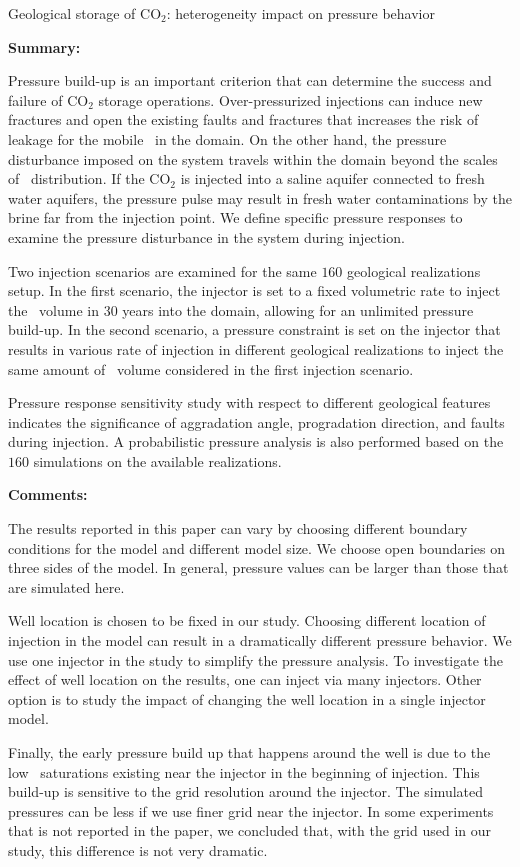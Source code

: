 {Geological storage of CO$_2$: heterogeneity impact on pressure behavior}
{\textbf{Summary:}

Pressure build-up is an important criterion that can determine the success and failure of
$\mbox{CO}_2$ storage operations. Over-pressurized injections can induce
new fractures and open the existing faults and fractures that increases the risk
of leakage for the mobile \coo\ in the domain. On the other
hand, the pressure disturbance imposed on the system travels within the
domain beyond the scales of \coo\ distribution. If the CO$_2$ is
injected into a saline aquifer connected to fresh water aquifers, the pressure
pulse may result in fresh water contaminations by the brine far from the
injection point. We define specific pressure responses to examine the pressure
disturbance in the system during injection.

Two injection scenarios are examined for the same $160$ geological realizations
setup. In the first scenario, the injector is set to a fixed volumetric rate to
inject the \coo\ volume in $30$ years into the domain, allowing for an
unlimited pressure build-up. In the second scenario, a pressure constraint is
set on the injector that results in various rate of injection in different
geological realizations to inject the same amount of \coo\ volume
considered in the first injection scenario. 

Pressure response sensitivity study with respect to different geological
features indicates the significance of aggradation angle, progradation
direction, and faults during injection. A probabilistic pressure analysis is
also performed based on the $160$ simulations on the available realizations.

\vspace{0.5cm}
\noindent\textbf{Comments:}

The results reported in this paper can vary by choosing different boundary conditions for the model and different model size. We choose open boundaries on three sides of the model. In general, pressure values can be larger than those that are simulated here.

Well location is chosen to be fixed in our study. Choosing different location of injection in the model can result in a dramatically different pressure behavior. We use one injector in the study to simplify the pressure analysis. To investigate the effect of well location on the results, one can inject via many injectors. Other option is to study the impact of changing the well location in a single injector model.

Finally, the early pressure build up that happens around the well is due to the low \coo\ saturations existing near the injector in the beginning of injection.
 This build-up is sensitive to the grid resolution around the injector. The simulated pressures can be less if we use finer grid near the injector. In some experiments that is not reported in the paper, we concluded that, with the grid used in our study, this difference is not very dramatic.}

